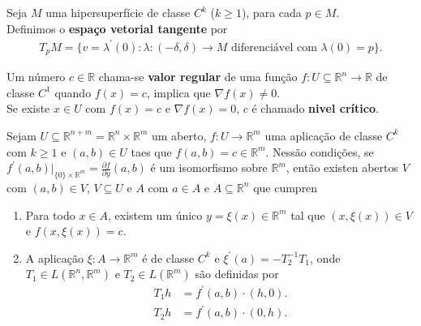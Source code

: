 \begin{definition}
  Seja $M$ uma hipersuperfície de classe $C^{k}$ ($k\geq 1$), para cada $p\in M$.\\
  Definimos o \textbf{espaço vetorial tangente} por
  \begin{align*}
    T_{p}M=\{v=\lambda^{\prime}(0):\lambda:(-\delta,\delta)\to M\text{ diferenciável com }\lambda(0)=p\}.
  \end{align*}
\end{definition}
\begin{definition}
  Um número $c\in\mathbb{R}$ chama-se \textbf{valor regular} de uma função $f:U\subseteq \mathbb{R}^{n}\to\mathbb{R}$ de classe $C^{1}$ quando $f(x)=c$, implica que $\nabla f(x)\neq 0$.\\
  Se existe $x\in U$ com $f(x)=c$ e $\nabla f(x)=0$, $c$ é chamado \textbf{nivel crítico}. 
\end{definition}
\begin{theorem}
  Sejam $U\subseteq \mathbb{R}^{n+m}=\mathbb{R}^{n}\times \mathbb{R}^{m}$ um aberto, $f:U\to\mathbb{R}^{m}$ uma aplicação de classe $C^k$ com $k\geq 1$ e $(a,b)\in U$ taes que $f(a,b)=c\in\mathbb{R}^{m}$. Nessão condições, se $f^{\prime}(a,b)\big|_{\{0\}\times\mathbb{R}^{m}}=\frac{\partial f}{\partial y}(a,b)$ é um isomorfismo sobre $\mathbb{R}^{m}$, então existen abertos $V$ com $(a,b)\in V$, $V\subseteq U$ e $A$ com $a\in A$ e $A\subseteq\mathbb{R}^{n}$ que cumpren
  \begin{enumerate}
    \item Para todo $x\in A$, existem um único $y=\xi(x)\in\mathbb{R}^{m}$ tal que $(x,\xi(x))\in V$ e $f(x,\xi(x))=c$.
    \item A aplicação $\xi:A\to\mathbb{R}^{m}$ é de classe $C^{k}$ e $\xi^{\prime}(a)=-T_2^{-1}T_1$, onde $T_1\in L(\mathbb{R}^{n},\mathbb{R}^{m})$ e $T_2\in L(\mathbb{R}^{m})$ são definidas por
      \begin{align*}
        T_1h&=f^{\prime}(a,b)\cdot (h,0).\\
        T_2h&=f^{\prime}(a,b)\cdot (0,h).
      \end{align*}
  \end{enumerate}
\end{theorem}
